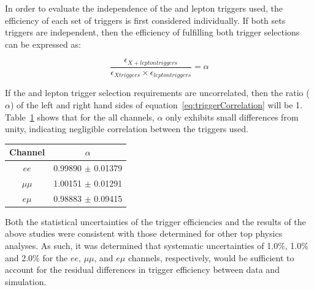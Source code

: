 In order to evaluate the independence of the \MET and lepton triggers used, the efficiency of each set of triggers is first considered individually.
If both sets triggers are independent, then the efficiency of fulfilling both trigger selections can be expressed as:

\begin{equation}
\frac{\epsilon_{X + lepton triggers}}{\epsilon_{X triggers} \times \epsilon_{lepton triggers}} = \alpha
\label{eq:triggerCorrelation}
\end{equation}

If the \MET and lepton trigger selection requirements are uncorrelated, then the ratio ($\alpha$) of the left and right hand sides of equation~\ref{eq:triggerCorrelation} will be 1.
Table~\ref{tab:triggerCorrelation} shows that for the all channels, $\alpha$ only exhibits small differences from unity, indicating negligible correlation between the triggers used.

\begin{table}[htbp]
\label{tab:triggerCorrelation}
  \centering
 \begin{tabular}{cc}
   \hline
   \textbf{Channel} & \textbf{$\alpha$}   \\
   \hline   
   $ee$ & 0.99890 $\pm$ 0.01379\\
   $\mu\mu$ & 1.00151 $\pm$ 0.01291\\
   $e \mu$ & 0.98883 $\pm$ 0.09415\\
   \hline
 \end{tabular}%
\end{table}

Both the statistical uncertainties of the trigger efficiencies and the results of the above studies were consistent with those determined for other top physics analyses.
As such, it was determined that systematic uncertainties of 1.0\%, 1.0\% and 2.0\% for the $ee$, $\mu\mu$, and $e\mu$ channels, respectively, would be sufficient to account for the residual differences in trigger efficiency between data and simulation.

